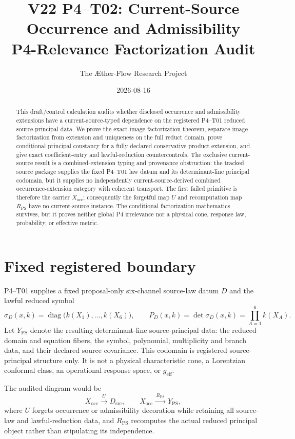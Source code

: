 \documentclass[11pt]{article}
\title{V22 P4--T02: Current-Source Occurrence and Admissibility\\
P4-Relevance Factorization Audit}
\author{The \AE ther-Flow Research Project}
\date{2026-08-16}
\begin{document}
\maketitle

\begin{abstract}
This draft/control calculation audits whether disclosed occurrence and
admissibility extensions have a current-source-typed dependence on the
registered P4--T01 reduced source-principal data.  We prove the exact image
factorization theorem, separate image factorization from extension and
uniqueness on the full reduct domain, prove conditional principal constancy
for a fully declared conservative product extension, and give exact
coefficient-entry and lawful-reduction countercontrols.  The exclusive
current-source result is a combined-extension typing and provenance
obstruction: the tracked source package supplies the fixed P4--T01 law datum
and its determinant-line principal codomain, but it supplies no independently
current-source-derived combined occurrence-extension category with coherent
transport.  The first failed primitive is therefore the carrier
$X_{\mathrm{occ}}$; consequently the forgetful map $U$ and recomputation map
$R_{\mathrm{PS}}$ have no current-source instance.  The conditional
factorization mathematics survives, but it proves neither global P4
irrelevance nor a physical cone, response law, probability, or effective
metric.
\end{abstract}

\section{Fixed registered boundary}

P4--T01 supplies a fixed proposal-only six-channel source-law datum $D$ and
the lawful reduced symbol
\begin{equation}
 \sigma_D(x,k)=\operatorname{diag}\bigl(k(X_1),\ldots,k(X_6)\bigr),
 \qquad
 P_D(x,k)=\det\sigma_D(x,k)=\prod_{A=1}^{6}k(X_A).
 \label{eq:p4t01}
\end{equation}
Let $Y_{\mathrm{PS}}$ denote the resulting determinant-line source-principal
data: the reduced domain and equation fibers, the symbol, polynomial,
multiplicity and branch data, and their declared source covariance.  This
codomain is registered source-principal structure only.  It is not a physical
characteristic cone, a Lorentzian conformal class, an operational response
space, or $g_{\mathrm{eff}}$.

The audited diagram would be
\begin{equation}
 X_{\mathrm{occ}}\xrightarrow{\ U\ }D_{\mathrm{src}},
 \qquad
 X_{\mathrm{occ}}\xrightarrow{\ R_{\mathrm{PS}}\ }Y_{\mathrm{PS}},
 \label{eq:diagram}
\end{equation}
where $U$ forgets occurrence or admissibility decoration while retaining all
source-law and lawful-reduction data, and $R_{\mathrm{PS}}$ recomputes the
actual reduced principal object rather than stipulating its independence.
\end{document}
